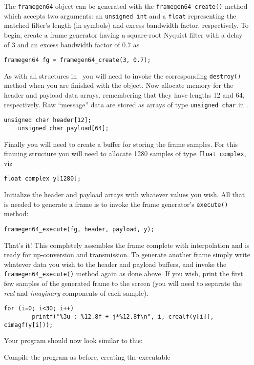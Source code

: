 The {\tt framegen64} object can be generated with the
{\tt framegen64\_create()} method which accepts two arguments:
an {\tt unsigned int} and a {\tt float}
representing the matched filter's length (in symbols) and
excess bandwidth factor, respectively.
To begin, create a frame generator having a square-root Nyquist filter
with a delay of 3 and an excess bandwidth factor of 0.7 as
%
\begin{Verbatim}[fontsize=\small]
    framegen64 fg = framegen64_create(3, 0.7);
\end{Verbatim}
%
As with all structures in \liquid\ you will need to invoke the
corresponding {\tt destroy()} method when you are finished with the
object.
Now allocate memory for the header and payload data arrays,
remembering that they have lengths 12 and 64, respectively.
Raw ``message'' data are stored as arrays of type {\tt unsigned char} in
\liquid.
%
\begin{Verbatim}[fontsize=\small]
    unsigned char header[12];
    unsigned char payload[64];
\end{Verbatim}
%
Finally you will need to create a buffer for storing the frame samples.
For this framing structure you will need to allocate 1280 samples of
type {\tt float complex}, viz
%
\begin{Verbatim}[fontsize=\small]
    float complex y[1280];
\end{Verbatim}
%
Initialize the header and payload arrays with whatever values you wish.
All that is needed to generate a frame is to invoke the frame
generator's {\tt execute()} method:
%
\begin{Verbatim}[fontsize=\small]
    framegen64_execute(fg, header, payload, y);
\end{Verbatim}
%
That's it!
This completely assembles the frame complete with interpolation and is
ready for up-conversion and transmission.
To generate another frame simply write whatever data you wish to the
header and payload buffers, and invoke the {\tt framegen64\_execute()}
method again as done above.
If you wish, print the first few samples of the generated frame to the
screen (you will need to separate the {\em real} and {\em imaginary}
components of each sample).
%
\begin{Verbatim}[fontsize=\small]
    for (i=0; i<30; i++)
        printf("%3u : %12.8f + j*%12.8f\n", i, crealf(y[i]), cimagf(y[i]));
\end{Verbatim}
%
Your program should now look similar to this:
%

%
Compile the program as before, creating the executable
